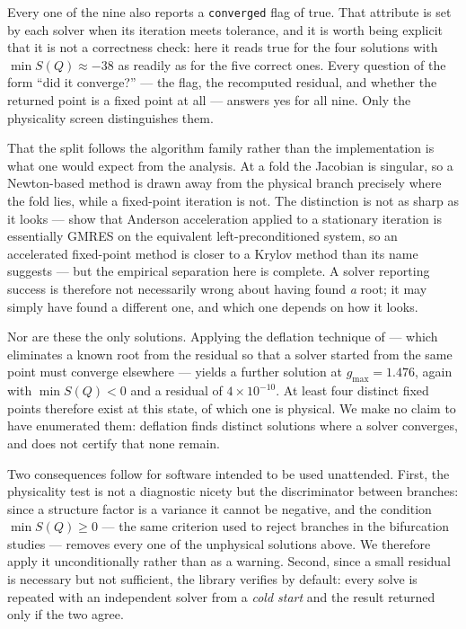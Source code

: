\documentclass[11pt,a4paper]{article}
\newcommand{\code}[1]{\texttt{#1}}
\begin{document}
Every one of the nine also reports a \code{converged} flag of true. That
attribute is set by each solver when its iteration meets tolerance, and it is
worth being explicit that it is not a correctness check: here it reads true
for the four solutions with $\min S(Q) \approx -38$ as readily as for the
five correct ones. Every question of the form ``did it converge?'' --- the
flag, the recomputed residual, and whether the returned point is a fixed
point at all --- answers yes for all nine. Only the physicality screen
distinguishes them.

That the split follows the algorithm family rather than the implementation is
what one would expect from the analysis. At a fold the Jacobian is singular,
so a Newton-based method is drawn away from the physical branch precisely
where the fold lies, while a fixed-point iteration is not. The distinction is
not as sharp as it looks --- \citet{WalkerNi2011} show that Anderson
acceleration applied to a stationary iteration is essentially GMRES on the
equivalent left-preconditioned system, so an accelerated fixed-point method
is closer to a Krylov method than its name suggests --- but the empirical
separation here is complete. A solver reporting
success is therefore not necessarily wrong about having found \emph{a} root;
it may simply have found a different one, and which one depends on how it
looks.

Nor are these the only solutions. Applying the deflation technique of
\citet{FarrellBirkissonFunke2015} --- which eliminates a known root from the
residual so that a solver started from the same point must converge elsewhere
--- yields a further solution at $g_{\max} = 1.476$, again with
$\min S(Q) < 0$ and a residual of $4\times10^{-10}$. At least four distinct
fixed points therefore exist at this state, of which one is physical. We make
no claim to have enumerated them: deflation finds distinct solutions where a
solver converges, and does not certify that none remain.

Two consequences follow for software intended to be used unattended. First,
the physicality test is not a diagnostic nicety but the discriminator between
branches: since a structure factor is a variance it cannot be negative, and
the condition $\min S(Q) \ge 0$ --- the same criterion used to reject branches
in the bifurcation studies --- removes every one of the unphysical solutions
above. We therefore apply it unconditionally rather than as a warning.
Second, since a small residual is necessary but not sufficient, the library
verifies by default: every solve is repeated with an independent solver from
a \emph{cold start} and the result returned only if the two agree.
\end{document}
